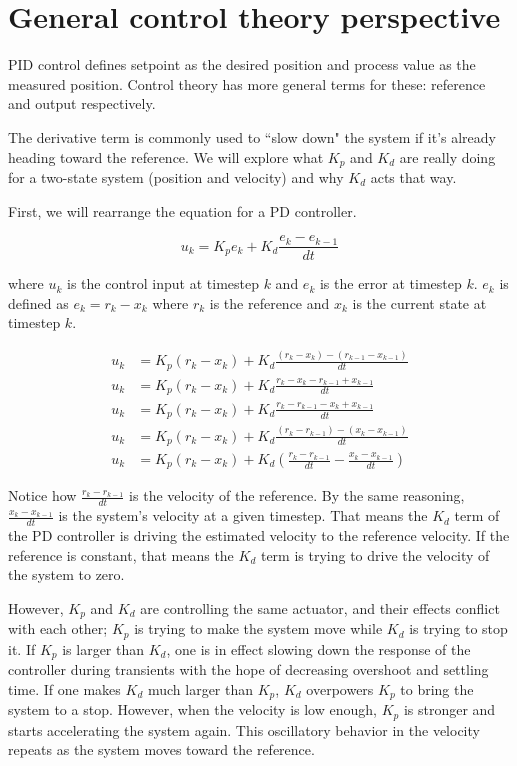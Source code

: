 \section{General control theory perspective}

PID control defines \gls{setpoint} as the desired position and
\gls{process value} as the measured position. Control theory has more general
terms for these: \gls{reference} and \gls{output} respectively.

The derivative term is commonly used to ``slow down" the \gls{system} if it's
already heading toward the \gls{reference}. We will explore what $K_p$ and $K_d$
are really doing for a two-state \gls{system} (position and velocity) and why
$K_d$ acts that way.

First, we will rearrange the equation for a PD controller.

\begin{equation*}
  u_k = K_p e_k + K_d \frac{e_k - e_{k-1}}{dt}
\end{equation*}

where $u_k$ is the \gls{control input} at timestep $k$ and $e_k$ is the
\gls{error} at timestep $k$. $e_k$ is defined as $e_k = r_k - x_k$ where $r_k$
is the \gls{reference} and $x_k$ is the current \gls{state} at timestep $k$.

\begin{align*}
  u_k &= K_p (r_k - x_k) + K_d \frac{(r_k - x_k) - (r_{k-1} - x_{k-1})}{dt} \\
  u_k &= K_p (r_k - x_k) + K_d \frac{r_k - x_k - r_{k-1} + x_{k-1}}{dt} \\
  u_k &= K_p (r_k - x_k) + K_d \frac{r_k - r_{k-1} - x_k + x_{k-1}}{dt} \\
  u_k &= K_p (r_k - x_k) + K_d \frac{(r_k - r_{k-1}) - (x_k - x_{k-1})}{dt} \\
  u_k &= K_p (r_k - x_k) + K_d \left(\frac{r_k - r_{k-1}}{dt} -
    \frac{x_k - x_{k-1}}{dt}\right)
\end{align*}

Notice how $\frac{r_k - r_{k-1}}{dt}$ is the velocity of the \gls{reference}. By
the same reasoning, $\frac{x_k - x_{k-1}}{dt}$ is the \gls{system}'s velocity at
a given timestep. That means the $K_d$ term of the PD controller is driving the
estimated velocity to the \gls{reference} velocity. If the \gls{reference} is
constant, that means the $K_d$ term is trying to drive the velocity of the
\gls{system} to zero.

However, $K_p$ and $K_d$ are controlling the same actuator, and their effects
conflict with each other; $K_p$ is trying to make the \gls{system} move while
$K_d$ is trying to stop it. If $K_p$ is larger than $K_d$, one is in effect
slowing down the response of the controller during transients with the hope of
decreasing \gls{overshoot} and \gls{settling time}. If one makes $K_d$ much
larger than $K_p$, $K_d$ overpowers $K_p$ to bring the \gls{system} to a stop.
However, when the velocity is low enough, $K_p$ is stronger and starts
accelerating the \gls{system} again. This oscillatory behavior in the velocity
repeats as the \gls{system} moves toward the \gls{reference}.
